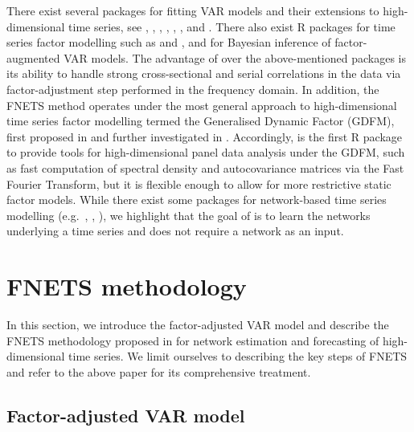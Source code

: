 There exist several packages for fitting VAR models and their extensions to high-dimensional time series, see  \citep{lsvar},  \citep{sparsevar},  \citep{nets},  \citep{haslbeck2020mgm},  \citep{epskamp2018gaussian},  \citep{nicholson2017bigvar},
and  \citep{wilms2021bigtime}.
There also exist R packages for time series factor modelling such as  \citep{dfms} and  \citep{mosley2023sparsedfm}, and  \citep{bernanke2005measuring} for Bayesian inference of factor-augmented VAR models.
The advantage of  over the above-mentioned packages is its ability to handle strong cross-sectional and serial correlations in the data via factor-adjustment step performed in the frequency domain.
In addition, the FNETS method operates under the most general approach to high-dimensional time series factor modelling termed the Generalised Dynamic Factor (GDFM), first proposed in \cite{forni2000generalized} and further investigated in \cite{forni2015dynamic}.
Accordingly,  is the first R package to provide tools for high-dimensional panel data analysis under the GDFM, such as fast computation of spectral density and autocovariance matrices via the Fast Fourier Transform, but it is flexible enough to allow for more restrictive static factor models.
While there exist some packages for network-based time series modelling (e.g.\ , \citeauthor{knight2020generalized}, \citeyear{knight2020generalized}), we highlight that the goal of  is to learn the networks underlying a time series and does not require a network as an input.

\section{FNETS methodology}
\label{sec:models}

In this section, we introduce the factor-adjusted VAR model and describe the FNETS methodology proposed in \cite{barigozzi2022fnets} for network estimation and forecasting of high-dimensional time series.
We limit ourselves to describing the key steps of FNETS and refer to the above paper for its comprehensive treatment.

\subsection{Factor-adjusted VAR model}

